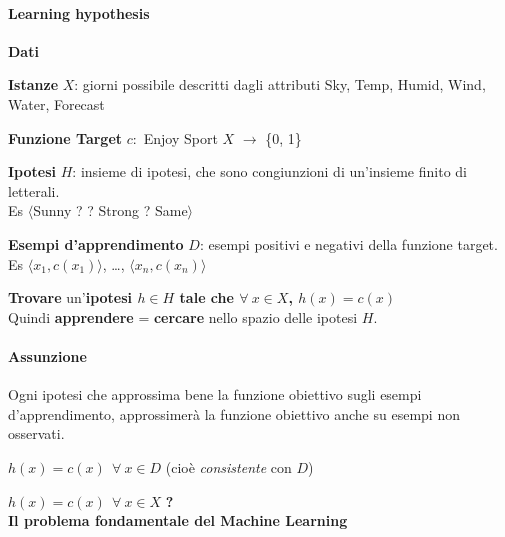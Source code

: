 \documentclass[10pt]{book}
\begin{document}
\paragraph{Learning hypothesis} \textbf{Dati}
\begin{list}{}{}
	\item \textbf{Istanze} $X$: giorni possibile descritti dagli attributi Sky, Temp, Humid, Wind, Water, Forecast
	\item \textbf{Funzione Target} $c : $ Enjoy Sport $X$ $\rightarrow$ \{0, 1\}
	\item \textbf{Ipotesi} $H$: insieme di ipotesi, che sono congiunzioni di un'insieme finito di letterali.\\Es $\langle$Sunny ? ? Strong ? Same$\rangle$
	\item \textbf{Esempi d'apprendimento} $D$: esempi positivi e negativi della funzione target.\\Es $\langle x_1, c(x_1)\rangle$, \ldots, $\langle x_n, c(x_n)\rangle$
\end{list}
\textbf{Trovare} un'\textbf{ipotesi $h \in H$ tale che $\forall\: x \in X$, $h(x) = c(x)$}\\
Quindi \textbf{apprendere} = \textbf{cercare} nello spazio delle ipotesi $H$.
\paragraph{Assunzione} Ogni ipotesi che approssima bene la funzione obiettivo sugli esempi d'apprendimento, approssimerà la funzione obiettivo anche su esempi non osservati.
\begin{list}{}{}
	\item $h(x) = c(x)\:\: \forall\: x \in D$ (cioè \textit{consistente} con $D$)
	\item $h(x) = c(x)\:\: \forall\: x \in X$ \textbf{?}\\
	\textbf{Il problema fondamentale del Machine Learning}
\end{list}
\pagebreak
\end{document}
